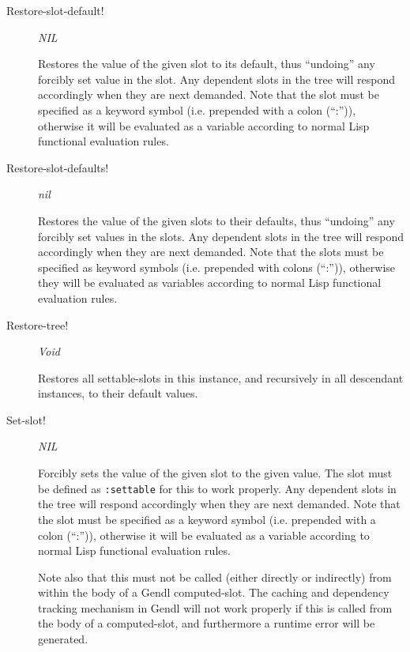 \documentclass [11pt]{book}
\begin{document}
\begin{itemize}
\begin{description}
\item [Restore-slot-default!]
\emph{NIL}

 Restores the value of the given slot to its default, thus ``undoing'' any forcibly set value
in the slot. Any dependent slots in the tree will respond accordingly when they are next demanded.
Note that the slot must be specified as a keyword symbol (i.e. prepended with a colon (``:'')),
otherwise it will be evaluated as a variable according to normal Lisp functional evaluation rules.




\item [Restore-slot-defaults!]
\emph{nil}

 Restores the value of the given slots to their defaults, thus ``undoing'' any forcibly set values
in the slots. Any dependent slots in the tree will respond accordingly when they are next demanded.
Note that the slots must be specified as keyword symbols (i.e. prepended with colons (``:'')),
otherwise they will be evaluated as variables according to normal Lisp functional evaluation rules.




\item [Restore-tree!]
\emph{Void}

 Restores all settable-slots in this instance, and recursively in all descendant instances,
to their default values.




\item [Set-slot!]
\emph{NIL}

 Forcibly sets the value of the given slot to the given value. The slot must be defined
as \texttt{:settable} for this to work properly. Any dependent slots in the tree will
respond accordingly when they are next demanded. Note that the slot must be specified as a keyword
symbol (i.e. prepended with a colon (``:'')), otherwise it will be evaluated as a variable according
to normal Lisp functional evaluation rules.



Note also that this must not be called (either directly or indirectly)
from within the body of a Gendl computed-slot. The caching and
dependency tracking mechanism in Gendl will not work properly if this
is called from the body of a computed-slot, and furthermore a runtime
error will be generated.







\end{description}
\end{itemize}
\end{document}
